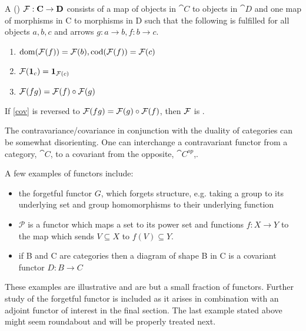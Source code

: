 \documentclass[../../main.tex]{subfiles}
\begin{document}
    \begin{definition}
        A ()  $\functor{F}: \cat{C} \to \cat{D}$ consists of a map of objects in $\cat{C}$ to objects in $\cat{D}$ and one map of morphisms in C to morphisms in D such that the following is fulfilled for all objects $a, b, c$ and arrows $g: a \to b, f: b \to c$.
        
        \begin{enumerate}
            \item $\domain{\functor{F}(f)} = \functor{F}(b), \codomain{\functor{F}(f)} = \functor{F}(c)$
            \item $\functor{F}(\idarrow[c]) = \idarrow[\functor{F}(c)]$
            \item $\functor{F}(fg) = \functor{F}(f) \circ \functor{F}(g)$ \label{cov}
        \end{enumerate}
        
        If \ref{cov} is reversed to $\functor{F}(fg) = \functor{F}(g) \circ \functor{F}(f)$, then $\functor{F}$ is .
    \end{definition}
    
    The contravariance/covariance in conjunction with the duality of categories can be somewhat disorienting. One can interchange a contravariant functor from a category, $\cat{C}$, to a covariant from the opposite, $\cat{C^{op}}$,.

    \begin{example}\label{functor_exmp}
        A few examples of functors include:
        \begin{itemize}
            \item the forgetful functor $G$, which forgets structure, e.g. taking a group to its underlying set and group homomorphisms to their underlying function
            \item $\mathcal{P}$ is a functor which maps a set to its power set and functions $f:X\to Y$ to the map which sends $V\subseteq X $ to $f(V)\subseteq Y$. 
            \item if B and C are categories then a diagram of shape B in C is a covariant functor $D:B\to C$
        \end{itemize}
    \end{example}

    These examples are illustrative and are but a small fraction of functors. Further study of the forgetful functor is included as it arises in combination with an adjoint functor of interest in the final section. The last example stated above might seem roundabout and will be properly treated next. 
    
\end{document}
